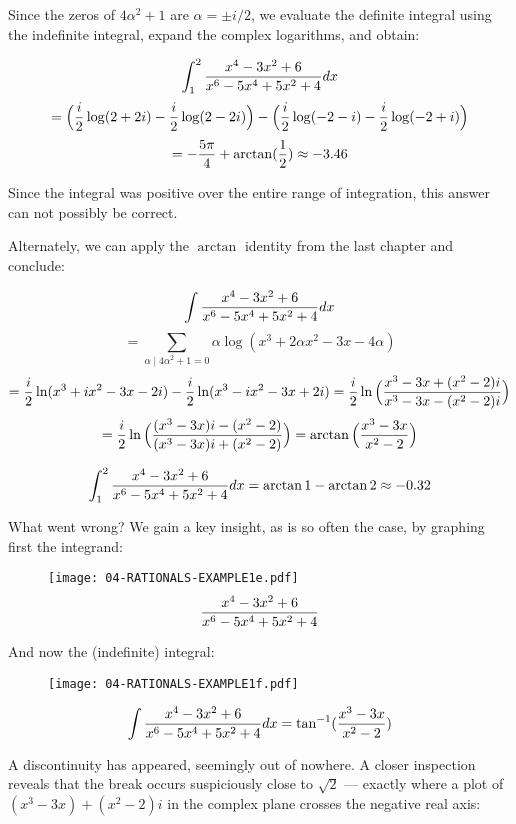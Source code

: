 Since the zeros of $4\alpha^2+1$ are $\alpha=\pm i/2$, we evaluate the
definite integral using the indefinite integral, expand the complex
logarithms, and obtain:

$$\int_1^2 {{x^4-3x^2+6}\over{x^6-5x^4+5x^2+4}} dx $$
$$= \Big({i\over2}\log(2+2i)-{i\over2}\log(2-2i)\Big)
 -\Big({i\over2}\log(-2-i)-{i\over2}\log(-2+i)\Big)$$
$$=-{5\pi\over4}+\arctan({1\over2}) \approx -3.46$$

Since the integral was positive over the entire range of integration,
this answer can not possibly be correct.

Alternately, we can apply the $\arctan$ identity from the last
chapter and conclude:

$$\int {{x^4-3x^2+6}\over{x^6-5x^4+5x^2+4}} dx $$
$$=\sum_{\alpha\mid 4\alpha^2+1=0} \alpha \log(x^3+2\alpha x^2-3x-4\alpha)$$
$$={i\over2}\ln(x^3+ix^2-3x-2i)-{i\over2}\ln(x^3-ix^2-3x+2i)
  ={i\over2}\ln{\Big({{x^3-3x+(x^2-2)i}\over{x^3-3x-(x^2-2)i}}\Big)}$$
$$={i\over2}\ln{\Big({{(x^3-3x)i-(x^2-2)}\over{(x^3-3x)i+(x^2-2)}}\Big)}
  =\arctan{\Big({{x^3-3x}\over{x^2-2}}\Big)}$$

$$\int_1^2 {{x^4-3x^2+6}\over{x^6-5x^4+5x^2+4}} dx = \arctan 1 - \arctan 2 \approx -0.32$$

What went wrong?
We gain a
key insight, as is so often the case, by graphing first the integrand:

\begin{figure}[!h]
\begin{center}
\texttt{[image: 04-RATIONALS-EXAMPLE1e.pdf]}
$${{x^4-3x^2+6}\over{x^6-5x^4+5x^2+4}}$$
\end{center}
\end{figure}

And now the (indefinite) integral:

\begin{figure}[!h]
\begin{center}
\texttt{[image: 04-RATIONALS-EXAMPLE1f.pdf]}
\end{center}
$$\int {{x^4-3x^2+6}\over{x^6-5x^4+5x^2+4}} dx =
\tan^{-1}({{x^3-3x}\over{x^2-2}})$$
\end{figure}

\vfill\eject

A discontinuity has appeared, seemingly out of nowhere.  A closer
inspection reveals that the break occurs suspiciously close to
$\sqrt{2}$ --- exactly where a plot of $(x^3-3x)+(x^2-2)i$ in
the complex plane crosses the negative real axis:

